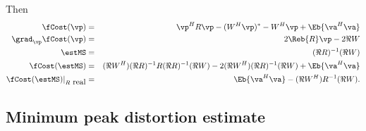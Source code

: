 Then 
\begin{eqnarray*}
   \fCost(\vp)           &=& \vp^H R \vp - (W^H\vp)^\ast -W^H\vp + \Eb{\va^H\va} \\
   \grad_\vp \fCost(\vp) &=& 2\Reb{R}\vp - 2\Re{W}  \\
   \estMS                  &=& (\Re{R})^{-1}(\Re{W})  \\
   \fCost(\estMS)        &=&    (\Re{W^H})(\Re{R})^{-1} R (\Re{R})^{-1}(\Re{W}) - 2(\Re{W^H})(\Re{R})^{-1}(\Re{W}) + \Eb{\va^H\va} \\
   \fCost(\estMS)|_{R\mbox{ real}} &=&    \Eb{\va^H\va} - (\Re{W^H})R^{-1}(\Re{W}).
\end{eqnarray*}



\subsection{Minimum peak distortion estimate}
\label{sec:eq_pd}

